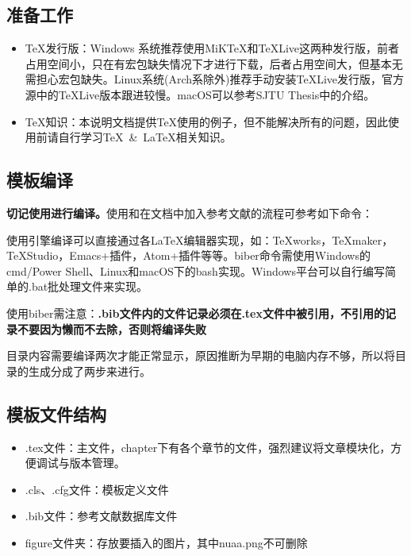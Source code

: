 \subsection{准备工作}
\begin{itemize}
  \item \TeX 发行版：Windows 系统推荐使用MiKTeX和\TeX Live这两种发行版，前者占用空间小，只在有宏包缺失情况下才进行下载，后者占用空间大，但基本无需担心宏包缺失。Linux系统(Arch系除外)推荐手动安装\TeX Live发行版，官方源中的TeXLive版本跟进较慢。macOS可以参考SJTU Thesis中的介绍。
  \item \TeX 知识：本说明文档提供\TeX 使用的例子，但不能解决所有的问题，因此使用前请自行学习\TeX~\&~\LaTeX 相关知识。
\end{itemize}

\subsection{模板编译}

\textbf{切记使用\XeLaTeX 进行编译。}使用\XeLaTeX 和在文档中加入参考文献的流程可参考如下命令：

\iffalse
\begin{lstlisting}[basicstyle=\small\ttfamily, caption=手动逐次编译, numbers=none]
xelatex -no-pdf .tex文件名
biber --debug .tex文件名
xelatex .tex文件名
xelatex .tex文件名
\end{lstlisting}
\fi

使用\XeLaTeX 引擎编译可以直接通过各\LaTeX 编辑器实现，如：TeXworks，TeXmaker，TeXStudio，Emacs+插件，Atom+插件等等。biber命令需使用Windows的cmd/Power Shell、Linux和macOS下的bash实现。Windows平台可以自行编写简单的.bat批处理文件来实现。

使用biber需注意：\textbf{.bib文件内的文件记录必须在.tex文件中被引用，不引用的记录不要因为懒而不去除，否则将编译失败}

目录内容需要编译两次才能正常显示，原因推断为早期的电脑内存不够，所以将目录的生成分成了两步来进行。

\subsection{模板文件结构}
\begin{itemize}[noitemsep,topsep=0pt,parsep=0pt,partopsep=0pt]
  \item .tex文件：主文件，chapter下有各个章节的文件，强烈建议将文章模块化，方便调试与版本管理。
  \item .cls、.cfg文件：模板定义文件
  \item .bib文件：参考文献数据库文件
  \item figure文件夹：存放要插入的图片，其中nuaa.png不可删除
\end{itemize}
